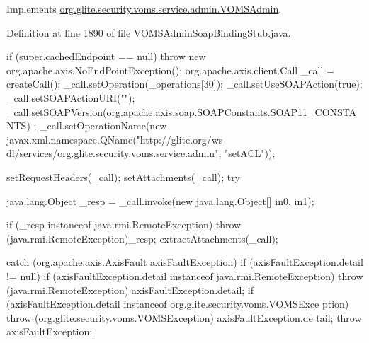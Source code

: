 \label{classorg_1_1glite_1_1security_1_1voms_1_1service_1_1admin_1_1VOMSAdminSoapBindingStub_a199347637b56ec4c3a1bf8f0921e9669}


Implements \hyperlink{interfaceorg_1_1glite_1_1security_1_1voms_1_1service_1_1admin_1_1VOMSAdmin_a8af93a80896770561cb6aa491802d631}{org.glite.security.voms.service.admin.VOMSAdmin}.



Definition at line 1890 of file VOMSAdminSoapBindingStub.java.


\begin{DoxyCode}
                                                                                 
                                                                                 {
        if (super.cachedEndpoint == null) {
            throw new org.apache.axis.NoEndPointException();
        }
        org.apache.axis.client.Call _call = createCall();
        _call.setOperation(_operations[30]);
        _call.setUseSOAPAction(true);
        _call.setSOAPActionURI("");
        _call.setSOAPVersion(org.apache.axis.soap.SOAPConstants.SOAP11_CONSTANTS)
      ;
        _call.setOperationName(new javax.xml.namespace.QName("http://glite.org/ws
      dl/services/org.glite.security.voms.service.admin", "setACL"));

        setRequestHeaders(_call);
        setAttachments(_call);
 try {        java.lang.Object _resp = _call.invoke(new java.lang.Object[] {in0, 
      in1});

        if (_resp instanceof java.rmi.RemoteException) {
            throw (java.rmi.RemoteException)_resp;
        }
        extractAttachments(_call);
  } catch (org.apache.axis.AxisFault axisFaultException) {
    if (axisFaultException.detail != null) {
        if (axisFaultException.detail instanceof java.rmi.RemoteException) {
              throw (java.rmi.RemoteException) axisFaultException.detail;
         }
        if (axisFaultException.detail instanceof org.glite.security.voms.VOMSExce
      ption) {
              throw (org.glite.security.voms.VOMSException) axisFaultException.de
      tail;
         }
   }
  throw axisFaultException;
}
    }
\end{DoxyCode}
